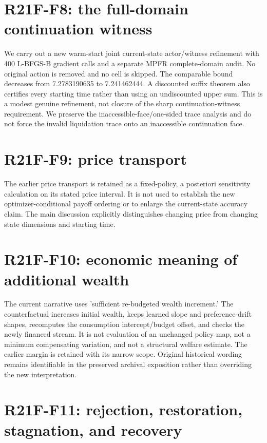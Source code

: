 \documentclass[ecta]{econsocart}
\theoremstyle{remark}
\begin{document}
\section{R21F-F8: the full-domain continuation witness}

We carry out a new warm-start joint current-state actor/witness refinement with 400 L-BFGS-B gradient calls and a separate MPFR complete-domain audit. No original action is removed and no cell is skipped. The comparable bound decreases from 7.2783190635 to 7.241462444. A discounted suffix theorem also certifies every starting time rather than using an undiscounted upper sum. This is a modest genuine refinement, not closure of the sharp continuation-witness requirement. We preserve the inaccessible-face/one-sided trace analysis and do not force the invalid liquidation trace onto an inaccessible continuation face.

\section{R21F-F9: price transport}

The earlier price transport is retained as a fixed-policy, a posteriori sensitivity calculation on its stated price interval. It is not used to establish the new optimizer-conditional payoff ordering or to enlarge the current-state accuracy claim. The main discussion explicitly distinguishes changing price from changing state dimensions and starting time.

\section{R21F-F10: economic meaning of additional wealth}

The current narrative uses 'sufficient re-budgeted wealth increment.' The counterfactual increases initial wealth, keeps learned slope and preference-drift shapes, recomputes the consumption intercept/budget offset, and checks the newly financed stream. It is not evaluation of an unchanged policy map, not a minimum compensating variation, and not a structural welfare estimate. The earlier margin is retained with its narrow scope. Original historical wording remains identifiable in the preserved archival exposition rather than overriding the new interpretation.

\section{R21F-F11: rejection, restoration, stagnation, and recovery}
\end{document}
